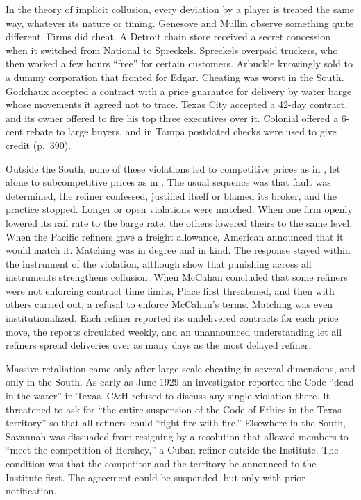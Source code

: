 In the theory of implicit collusion, every deviation by a player is treated the same way, whatever its nature or
timing. Genesove and Mullin observe something quite different. Firms did cheat. A Detroit chain store received a
secret concession when it switched from National to Spreckels. Spreckels overpaid truckers, who then worked a few
hours ``free'' for certain customers. Arbuckle knowingly sold to a dummy corporation that fronted for Edgar.
Cheating was worst in the South. Godchaux accepted a contract with a price guarantee for delivery by water barge
whose movements it agreed not to trace. Texas City accepted a 42-day contract, and its owner offered to fire his
top three executives over it. Colonial offered a 6-cent rebate to large buyers, and in Tampa postdated checks were
used to give credit (p.~390).

Outside the South, none of these violations led to competitive prices as in \citet{GreenPorter1984}, let alone
to subcompetitive prices as in \citet{AbreuPearceStacchetti1986}. The usual sequence was that fault was
determined, the refiner confessed, justified itself or blamed its broker, and the practice stopped. Longer or open
violations were matched. When one firm openly lowered its rail rate to the barge rate, the others lowered theirs
to the same level. When the Pacific refiners gave a freight allowance, American announced that it would match it.
Matching was in degree and in kind. The response stayed within the instrument of the violation, although
\citet{BernheimWhinston1990} show that punishing across all instruments strengthens collusion. When McCahan
concluded that some refiners were not enforcing contract time limits, Place first threatened, and then with
others carried out, a refusal to enforce McCahan's terms. Matching was even institutionalized. Each refiner
reported its undelivered contracts for each price move, the reports circulated weekly, and an unannounced
understanding let all refiners spread deliveries over as many days as the most delayed refiner.

Massive retaliation came only after large-scale cheating in several dimensions, and only in the South. As early as
June 1929 an investigator reported the Code ``dead in the water'' in Texas. C\&H refused to discuss any single
violation there. It threatened to ask for ``the entire suspension of the Code of Ethics in the Texas territory''
so that all refiners could ``fight fire with fire.'' Elsewhere in the South, Savannah was dissuaded
from resigning by a resolution that allowed members to ``meet the competition of Hershey,'' a Cuban refiner
outside the Institute. The condition was that the competitor and the territory be announced to the Institute
first. The agreement could be suspended, but only with prior notification.

